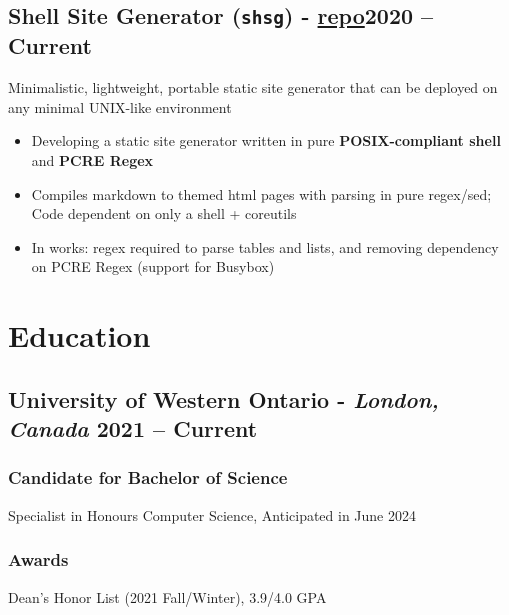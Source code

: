 \documentclass[9pt]{article}
\begin{document}
\subsection{Shell Site Generator (\texttt{shsg}) \normalsize\textnormal{- \href{https://github.com/ianayl/shsg}{repo}}\hfill \normalsize\textnormal{2020 -- Current}}
    Minimalistic, lightweight, portable static site generator that can be deployed on any minimal UNIX-like environment
\vspace{-0.5em}
\begin{itemize}
  \item Developing a static site generator written in pure \textbf{POSIX-compliant shell} and \textbf{PCRE Regex}
    \item Compiles markdown to themed html pages with parsing in pure regex/sed; Code dependent on only a shell + coreutils 
    \item In works: regex required to parse tables and lists, and removing dependency on PCRE Regex (support for Busybox)
\end{itemize}

\section{Education}
\subsection{University of Western Ontario - \normalsize\textit{London, Canada} \hfill \normalsize\textnormal{2021 -- Current}}
\subsubsection{Candidate for Bachelor of Science} Specialist in Honours Computer Science, Anticipated in June 2024

\subsubsection{Awards} Dean's Honor List (2021 Fall/Winter), 3.9/4.0 GPA %
\end{document}
